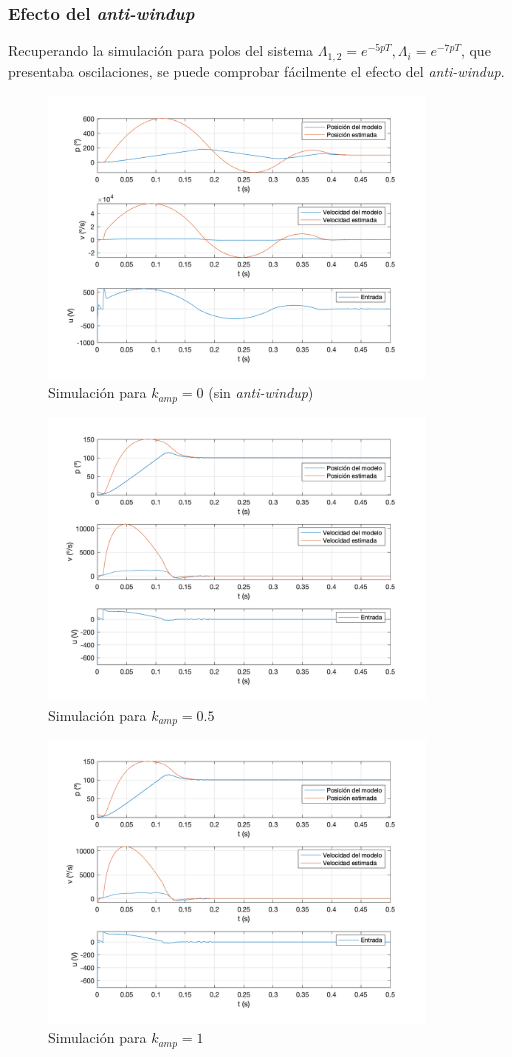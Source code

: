 \documentclass[a4paper, 12pt]{article}
\begin{document}
\subsubsection{Efecto del \textit{anti-windup}}
Recuperando la simulación para polos del sistema  $\Lambda_{1, 2} = e^{-5pT}, \Lambda_i = e^{-7pT}$, que presentaba oscilaciones, se puede comprobar fácilmente el efecto del \textit{anti-windup}.
\begin{figure}[H]
	\centering
	\includegraphics*[height = 7.5cm]{figs/p6/kamp0}
	\caption{Simulación para $k_{amp} = 0$ (sin \textit{anti-windup})}
\end{figure}
\begin{figure}[H]
	\centering
	\includegraphics*[height = 7.5cm]{figs/p6/kamp05}
	\caption{Simulación para $k_{amp} = 0.5$}
\end{figure}
\begin{figure}[H]
	\centering
	\includegraphics*[height = 7.5cm]{figs/p6/kamp05}
	\caption{Simulación para $k_{amp} = 1$}
\end{figure}
\end{document}
